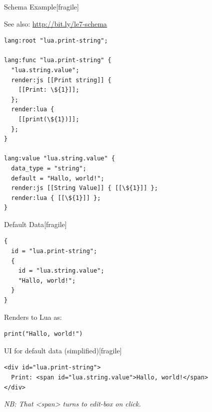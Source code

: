 \documentclass[handout]{beamer}
\begin{document}

\begin{frame}{Schema Example}[fragile]

See also: \url{http://bit.ly/le7-schema}

\begin{verbatim}
lang:root "lua.print-string";

lang:func "lua.print-string" {
  "lua.string.value";
  render:js [[Print string]] {
    [[Print: \${1}]];
  };
  render:lua {
    [[print(\${1})]];
  };
}

lang:value "lua.string.value" {
  data_type = "string";
  default = "Hallo, world!";
  render:js [[String Value]] { [[\${1}]] };
  render:lua { [[\${1}]] };
}
\end{verbatim}

\end{frame}


\begin{frame}{Default Data}[fragile]

\begin{verbatim}
{
  id = "lua.print-string";
  {
    id = "lua.string.value";
    "Hallo, world!";
  }
}
\end{verbatim}

Renders to Lua as:

\begin{verbatim}
print("Hallo, world!")
\end{verbatim}

\end{frame}


\begin{frame}{UI for default data (simplified)}[fragile]

\begin{verbatim}
<div id="lua.print-string">
  Print: <span id="lua.string.value">Hallo, world!</span>
</div>
\end{verbatim}

\textit{NB: That <span> turns to edit-box on click.}

\end{frame}

\end{document}
